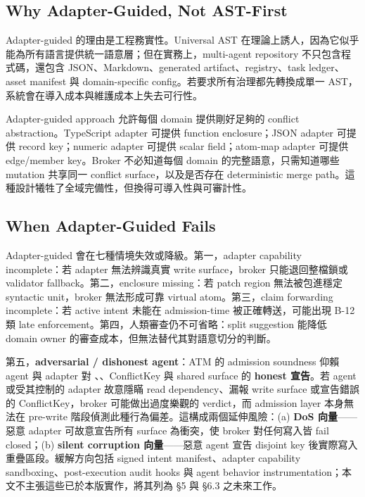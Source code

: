 \documentclass[a4paper,fontset=none]{ctexart}
\begin{document}
\subsection{Why Adapter-Guided, Not AST-First}

Adapter-guided 的理由是工程務實性。Universal AST 在理論上誘人，因為它似乎能為所有語言提供統一語意層；但在實務上，multi-agent repository 不只包含程式碼，還包含 JSON、Markdown、generated artifact、registry、task ledger、asset manifest 與 domain-specific config。若要求所有治理都先轉換成單一 AST，系統會在導入成本與維護成本上失去可行性。

Adapter-guided approach 允許每個 domain 提供剛好足夠的 conflict abstraction。TypeScript adapter 可提供 function enclosure；JSON adapter 可提供 record key；numeric adapter 可提供 scalar field；atom-map adapter 可提供 edge/member key。Broker 不必知道每個 domain 的完整語意，只需知道哪些 mutation 共享同一 conflict surface，以及是否存在 deterministic merge path。這種設計犧牲了全域完備性，但換得可導入性與可審計性。

\subsection{When Adapter-Guided Fails}

Adapter-guided 會在七種情境失效或降級。第一，adapter capability incomplete：若 adapter 無法辨識真實 write surface，broker 只能退回整檔鎖或 validator fallback。第二，enclosure missing：若 patch region 無法被包進穩定 syntactic unit，broker 無法形成可靠 virtual atom。第三，claim forwarding incomplete：若 active intent 未能在 admission-time 被正確轉送，可能出現 B-12 類 late enforcement。第四，人類審查仍不可省略：split suggestion 能降低 domain owner 的審查成本，但無法替代其對語意切分的判斷。

第五，\textbf{adversarial / dishonest agent}：ATM 的 admission soundness 仰賴 agent 與 adapter 對 \texttt{}、\texttt{}、ConflictKey 與 shared surface 的 \textbf{honest 宣告}。若 agent 或受其控制的 adapter 故意隱瞞 read dependency、漏報 write surface 或宣告錯誤的 ConflictKey，broker 可能做出過度樂觀的 \texttt{} verdict，而 admission layer 本身無法在 pre-write 階段偵測此種行為偏差。這構成兩個延伸風險：(a) \textbf{DoS 向量}------惡意 adapter 可故意宣告所有 surface 為衝突，使 broker 對任何寫入皆 fail closed；(b) \textbf{silent corruption 向量}------惡意 agent 宣告 disjoint key 後實際寫入重疊區段。緩解方向包括 signed intent manifest、adapter capability sandboxing、post-execution audit hooks 與 agent behavior instrumentation；本文不主張這些已於本版實作，將其列為 §5 與 §6.3 之未來工作。
\end{document}
